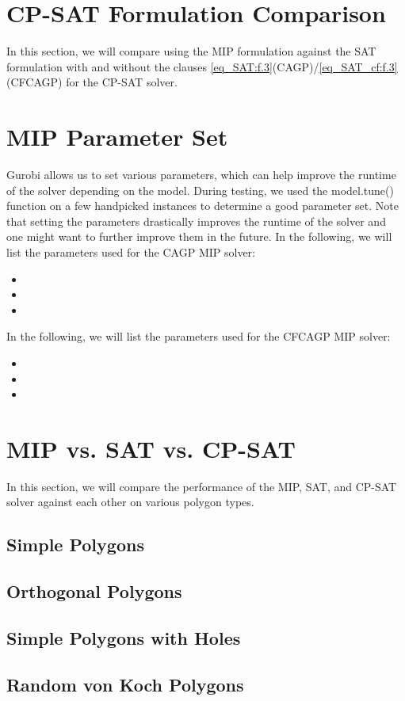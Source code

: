 \section{CP-SAT Formulation Comparison}
In this section, we will compare using the MIP formulation against the SAT formulation with and without the clauses \cref{eq_SAT:f.3}(CAGP)/\cref{eq_SAT_cf:f.3}(CFCAGP) for the CP-SAT solver. 

\section{MIP Parameter Set}
Gurobi allows us to set various parameters, which can help improve the runtime of the solver depending on the model. During testing, we used the model.tune() function on a few handpicked instances to determine a good parameter set. Note that setting the parameters drastically improves the runtime of the solver and one might want to further improve them in the future. In the following, we will list the parameters used for the CAGP MIP solver:
\begin{itemize}
  \item 
  \item 
  \item 
\end{itemize}
In the following, we will list the parameters used for the CFCAGP MIP solver:
\begin{itemize}
  \item 
  \item 
  \item 
\end{itemize}

\section{MIP vs. SAT vs. CP-SAT}
In this section, we will compare the performance of the MIP, SAT, and CP-SAT solver against each other on various polygon types.

\subsection{Simple Polygons}

\subsection{Orthogonal Polygons}

\subsection{Simple Polygons with Holes}

\subsection{Random von Koch Polygons}

